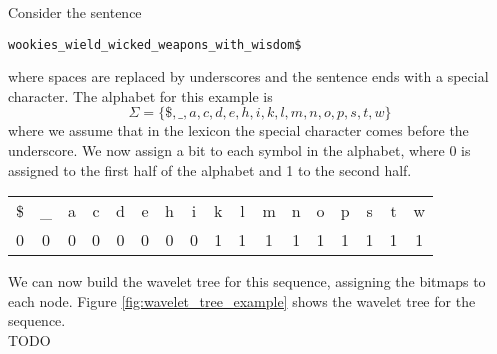 \begin{example}
    Consider the sentence
    \begin{center}
        \texttt{wookies\_wield\_wicked\_weapons\_with\_wisdom\$}
    \end{center}
    where spaces are replaced by underscores and the sentence ends with a special character. The alphabet for this example is
    \[
        \Sigma = \{\$, \_, a, c, d, e, h, i, k, l, m, n, o, p, s, t, w \}
    \]
    where we assume that in the lexicon the special character comes before the underscore. We now assign a bit to each symbol in the alphabet, where 0 is assigned to the first half of the alphabet and 1 to the second half.

    \begin{tabular}{*{17}{c}}
        \$                        & \_                        & a                         & c                         & d                         & e                         & h                         & i                         & k                         & l                         & m                         & n                         & o                         & p                         & s                         & t                         & w                         \\
        \textcolor{purple!100}{0} & \textcolor{purple!100}{0} & \textcolor{purple!100}{0} & \textcolor{purple!100}{0} & \textcolor{purple!100}{0} & \textcolor{purple!100}{0} & \textcolor{purple!100}{0} & \textcolor{purple!100}{0} & \textcolor{purple!100}{1} & \textcolor{purple!100}{1} & \textcolor{purple!100}{1} & \textcolor{purple!100}{1} & \textcolor{purple!100}{1} & \textcolor{purple!100}{1} & \textcolor{purple!100}{1} & \textcolor{purple!100}{1} & \textcolor{purple!100}{1} \\
    \end{tabular} \vspace{0.4cm}

    \noindent We can now build the wavelet tree for this sequence, assigning the bitmaps to each node. Figure \ref{fig:wavelet_tree_example} shows the wavelet tree for the sequence. \\

    TODO


\end{example}


